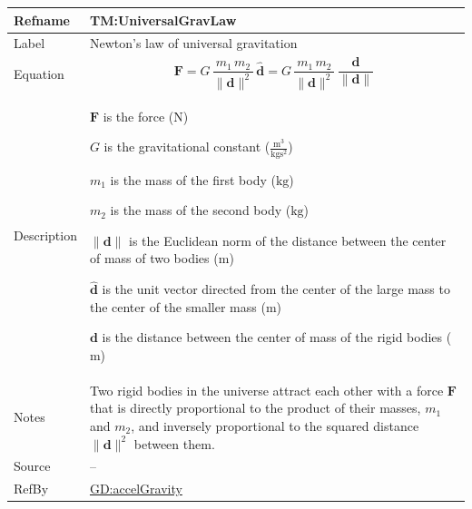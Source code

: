 \documentclass[12pt]{article}
\begin{document}
\medskip
\noindent
\begin{minipage}{\textwidth}
\begin{tabular}{>{\raggedright}p{}>{\raggedright\arraybackslash}p{}}
\toprule \textbf{Refname} & \textbf{TM:UniversalGravLaw}
\label{TM:UniversalGravLaw}
\\ \midrule
Label & Newton's law of universal gravitation
        
\\ \midrule
Equation & \begin{displaymath}
           \symbf{F}=G\,\frac{{m_{1}}\,{m_{2}}}{\|\symbf{d}\|^{2}}\,\symbf{\hat{d}}=G\,\frac{{m_{1}}\,{m_{2}}}{\|\symbf{d}\|^{2}}\,\frac{\symbf{d}}{\|\symbf{d}\|}
           \end{displaymath}
\\ \midrule
Description & \begin{symbDescription}
              \item{$\symbf{F}$ is the force (${\text{N}}$)}
              \item{$G$ is the gravitational constant ($\frac{\text{m}^{3}}{\text{kg}\text{s}^{2}}$)}
              \item{${m_{1}}$ is the mass of the first body (${\text{kg}}$)}
              \item{${m_{2}}$ is the mass of the second body (${\text{kg}}$)}
              \item{$\|\symbf{d}\|$ is the Euclidean norm of the distance between the center of mass of two bodies (${\text{m}}$)}
              \item{$\symbf{\hat{d}}$ is the unit vector directed from the center of the large mass to the center of the smaller mass (${\text{m}}$)}
              \item{$\symbf{d}$ is the distance between the center of mass of the rigid bodies (${\text{m}}$)}
              \end{symbDescription}
\\ \midrule
Notes & Two rigid bodies in the universe attract each other with a force $\symbf{F}$ that is directly proportional to the product of their masses, ${m_{1}}$ and ${m_{2}}$, and inversely proportional to the squared distance ${\|\symbf{d}\|^{2}}$ between them.
        
\\ \midrule
Source & --
         
\\ \midrule
RefBy & \hyperref[GD:accelGravity]{GD:accelGravity}
        
\\ \bottomrule
\end{tabular}
\end{minipage}
\end{document}
